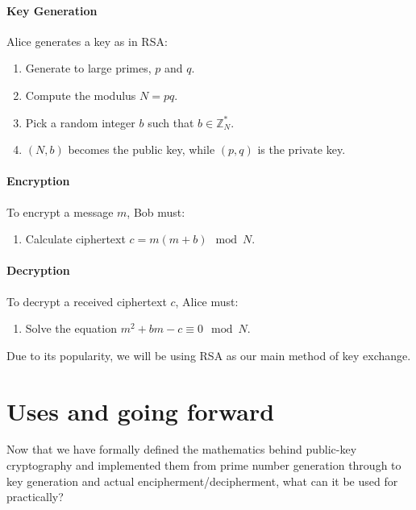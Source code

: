   \paragraph{Key Generation}
  
  Alice generates a key as in RSA:
  
  \begin{enumerate}
    \item Generate to large primes, $p$ and $q$.
    \item Compute the modulus $N = pq$.
    \item Pick a random integer $b$ such that $b \in \mathbb{Z}_N^*$.
    \item $(N,b)$ becomes the public key, while $(p,q)$ is the private key.
  \end{enumerate}
  
  \paragraph{Encryption}
  
  To encrypt a message $m$, Bob must:
  
  \begin{enumerate}
    \item Calculate ciphertext $c = m(m+b) \mod N$.
  \end{enumerate}
  
  \paragraph{Decryption}
  
  To decrypt a received ciphertext $c$, Alice must:
  
  \begin{enumerate}
    \item Solve the equation $m^2 + bm -c \equiv 0 \mod N$.
  \end{enumerate}
    
Due to its popularity, we will be using RSA as our main method of key exchange.

\section{Uses and going forward}

Now that we have formally defined the mathematics behind public-key cryptography and implemented them from prime number generation through to key generation and actual encipherment/decipherment, what can it be used for practically? 


